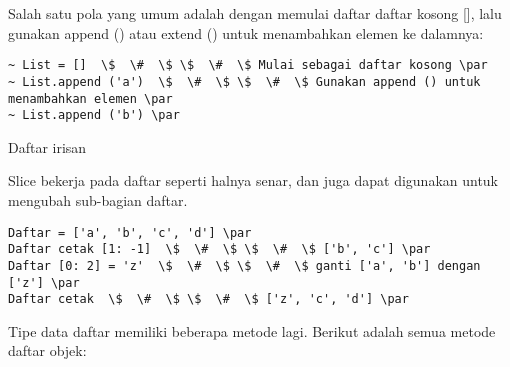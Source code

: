 \vspace{12pt}
Salah satu pola yang umum adalah dengan memulai daftar daftar kosong [], lalu gunakan append () atau extend () untuk menambahkan elemen ke dalamnya: \par
\vspace{12pt}
\begin{verbatim}
~ List = []  \$  \#  \$ \$  \#  \$ Mulai sebagai daftar kosong \par
~ List.append ('a')  \$  \#  \$ \$  \#  \$ Gunakan append () untuk menambahkan elemen \par
~ List.append ('b') \par
\end{verbatim}
\vspace{12pt}
Daftar irisan \par
\vspace{12pt}
Slice bekerja pada daftar seperti halnya senar, dan juga dapat digunakan untuk mengubah sub-bagian daftar. \par
\vspace{12pt}
\begin{verbatim}
Daftar = ['a', 'b', 'c', 'd'] \par
Daftar cetak [1: -1]  \$  \#  \$ \$  \#  \$ ['b', 'c'] \par
Daftar [0: 2] = 'z'  \$  \#  \$ \$  \#  \$ ganti ['a', 'b'] dengan ['z'] \par
Daftar cetak  \$  \#  \$ \$  \#  \$ ['z', 'c', 'd'] \par
\end{verbatim}
Tipe data daftar memiliki beberapa metode lagi. Berikut adalah semua metode daftar objek: \par
